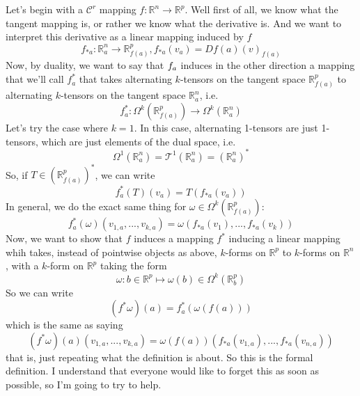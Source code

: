 \documentclass{article}
\newcommand{\reals}[0]{\mathbb{R}}
\newcommand{\mc}[1]{\mathcal{#1}}
\begin{document}
Let's begin with a \(\mc{C}^r\) mapping \(f: \reals^n \to \reals^p\). Well first of all, we know what the tangent mapping is, or rather we know what the derivative is. And we want to interpret this derivative as a linear mapping induced by \(f\)
\begin{equation}
  f_{*a}: \reals^n_a \to \reals^p_{f(a)}, f_{*a}(v_a) = Df(a)(v)_{f(a)}
\end{equation}
Now, by duality, we want to say that \(f_{\*a}\) induces in the other direction a mapping that we'll call \(f^*_a\) that takes alternating \(k\)-tensors on the tangent space \(\reals^p_{f(a)}\) to alternating \(k\)-tensors on the tangent space \(\reals^n_a\), i.e.
\begin{equation}
  f_a^*: \Omega^k(\reals^p_{f(a)}) \to \Omega^k(\reals^n_a)
\end{equation}
Let's try the case where \(k = 1\). In this case, alternating 1-tensors are just 1-tensors, which are just elements of the dual space, i.e.
\begin{equation}
  \Omega^1(\reals^n_a) = \mc{T}^1(\reals^n_a) = (\reals^n_a)^*
\end{equation}
So, if \(T \in (\reals^p_{f(a)})^*\), we can write
\begin{equation}
  f_a^*(T)(v_a) = T(f_{*a}(v_a))
\end{equation}
In general, we do the exact same thing for \(\omega \in \Omega^k(\reals^p_{f(a)})\):
\begin{equation}
  f_a^*(\omega)(v_{1,a},...,v_{k,a}) = \omega(f_{*a}(v_1),...,f_{*a}(v_k))
\end{equation}
Now, we want to show that \(f\) induces a mapping \(f^*\) inducing a linear mapping whih takes, instead of pointwise objects as above, \(k\)-forms on \(\reals^p\) to \(k\)-forms on \(\reals^n\), with a \(k\)-form on \(\reals^p\) taking the form
\begin{equation}
  \omega: b \in \reals^p \mapsto \omega(b) \in \Omega^k(\reals^p_b)
\end{equation}
So we can write
\begin{equation}
  (f^*\omega)(a) = f^*_a(\omega(f(a)))
  \label{novs}
\end{equation}
which is the same as saying
\begin{equation}
  (f^*\omega)(a)(v_{1, a},...,v_{k, a}) = \omega(f(a))(f_{*a}(v_{1,a}),...,f_{*a}(v_{n,a}))
\end{equation}
that is, just repeating what the definition is about. So this is the formal definition. I understand that everyone would like to forget this as soon as possible, so I'm going to try to help.
\end{document}
